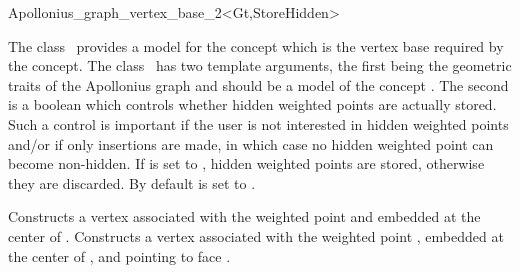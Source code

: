 
\begin{ccRefClass}{Apollonius_graph_vertex_base_2<Gt,StoreHidden>}


\ccDefinition

The class \ccRefName\ provides a model for the
 concept which is the vertex base
required by the  concept. The
class \ccRefName\ has two template arguments, the first being the
geometric traits of the Apollonius graph and should be a model of the
concept . The second is a boolean which
controls whether hidden weighted points are actually stored. Such a
control is important if the user is not interested in hidden weighted
points and/or if only insertions are made, in which case no hidden
weighted point can become non-hidden. If  is set to
, hidden weighted points are stored, otherwise they are
discarded. By default  is set to .


\ccIsModel
{}

\ccCreation
{}  %

\ccGlue
{}
{Constructs a vertex associated with the weighted point  and
embedded at the center of .}
\ccGlue
{}
{Constructs a vertex associated with
the weighted point , embedded at the center of ,
and pointing to face .}



\ccSeeAlso
{}\\
\\

\end{ccRefClass}


